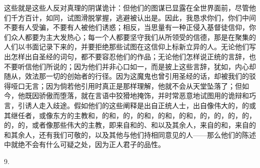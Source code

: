 这些就是这些人反对真理的阴谋诡计：但他们的图谋已显露在全世界面前，尽管他们千方百计，如同，试图滑脱掌握，逃避被认出是。因此，我恳求你们，你们中间不要有人受骗，不要有人被他们诱惑；相反，当思量有一种正侵入基督徒信仰，你们众人都要为主大发热心；每一个人都要坚守我们从所领受的信德，那是在聚集的人们以书面记录下来的，并要拒绝那些试图在这信仰上标新立异的人。无论他们写出怎样出自圣经的词句，都不要容忍他们的作品；无论他们怎样说正统的言辞，也不要听信他们所说的；因为他们并非心口如一，而是披上这些言辞，犹如，内心却随从，效法那一切的创始者的行径。因为这魔鬼也曾引用圣经的话，却被我们的驳得哑口无言；因为倘若他引用时真正是那样理解，他就不会从天堂坠落了；但如今，他既因骄傲而堕落，就在言语中狡猾地掩饰，并时常恶意地试图用的诡辩和巧言，引诱人走入歧途。假如他们的这些阐释是出自正统人士，出自像伟大的，的或其继任者，或像东方的主教和，的和，的，的和，的和，的和，的，的，的，的，的，的，或者像那些伟大的主教，即来自和的、和以及其余人，来自的和，来自的和其余人，还有我们可敬的，以及其他与他们持相同意见的人——那么他们的陈述中就绝不会有什么可疑之处，因为正人君子的品性。\par

9. \par


